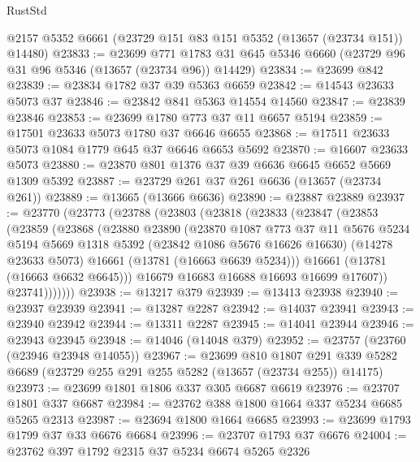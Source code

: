 \begin{lexlean}{RustStd}
\begin{coremodule}
    @2157
    @5352
    @6661
    (@23729 @151 @83 @151 @5352 (@13657 (@23734 @151)) @14480)
@23833 := @23699
    @771
    @1783
    @31
    @645
    @5346
    @6660
    (@23729 @96 @31 @96 @5346 (@13657 (@23734 @96)) @14429)
@23834 := @23699 @842
@23839 := @23834 @1782 @37 @39 @5363 @6659
@23842 := @14543 @23633 @5073 @37
@23846 := @23842 @841 @5363 @14554 @14560
@23847 := @23839 @23846
@23853 := @23699 @1780 @773 @37 @11 @6657 @5194
@23859 := @17501 @23633 @5073 @1780 @37 @6646 @6655
@23868 := @17511 @23633 @5073 @1084 @1779 @645 @37 @6646 @6653 @5692
@23870 := @16607 @23633 @5073
@23880 := @23870 @801 @1376 @37 @39 @6636 @6645 @6652 @5669 @1309 @5392
@23887 := @23729 @261 @37 @261 @6636 (@13657 (@23734 @261))
@23889 := @13665 (@13666 @6636)
@23890 := @23887 @23889
@23937 := @23770
    (@23773
      (@23788
        (@23803
          (@23818
            (@23833
              (@23847
                (@23853
                  (@23859
                    (@23868
                      (@23880
                        @23890
                        (@23870
                          @1087
                          @773
                          @37
                          @11
                          @5676
                          @5234
                          @5194
                          @5669
                          @1318
                          @5392
                          (@23842 @1086 @5676 @16626 @16630)
                          (@14278 @23633 @5073)
                          @16661
                          (@13781 (@16663 @6639 @5234)))
                        @16661
                        (@13781 (@16663 @6632 @6645)))
                      @16679
                      @16683
                      @16688
                      @16693
                      @16699
                      @17607))
                  @23741)))))))
@23938 := @13217 @379
@23939 := @13413 @23938
@23940 := @23937 @23939
@23941 := @13287 @2287
@23942 := @14037 @23941
@23943 := @23940 @23942
@23944 := @13311 @2287
@23945 := @14041 @23944
@23946 := @23943 @23945
@23948 := @14046 (@14048 @379)
@23952 := @23757 (@23760 (@23946 @23948 @14055))
@23967 := @23699
    @810
    @1807
    @291
    @339
    @5282
    @6689
    (@23729 @255 @291 @255 @5282 (@13657 (@23734 @255)) @14175)
@23973 := @23699 @1801 @1806 @337 @305 @6687 @6619
@23976 := @23707 @1801 @337 @6687
@23984 := @23762 @388 @1800 @1664 @337 @5234 @6685 @5265 @2313
@23987 := @23694 @1800 @1664 @6685
@23993 := @23699 @1793 @1799 @37 @33 @6676 @6684
@23996 := @23707 @1793 @37 @6676
@24004 := @23762 @397 @1792 @2315 @37 @5234 @6674 @5265 @2326

\end{coremodule}
\end{lexlean}
